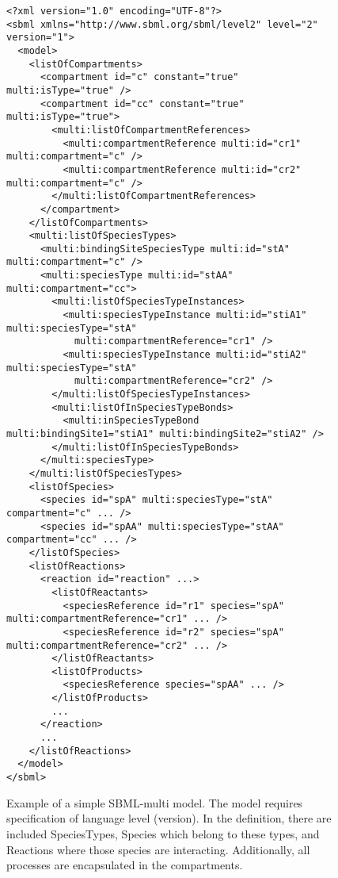 \documentclass[11pt,a4paper]{report}
\begin{document}
\begin{figure}[!h]
\lstset{language=XML}
\begin{lstlisting}[basicstyle=\scriptsize, frame=single]
<?xml version="1.0" encoding="UTF-8"?>
<sbml xmlns="http://www.sbml.org/sbml/level2" level="2" version="1">
  <model>
    <listOfCompartments>
      <compartment id="c" constant="true" multi:isType="true" />
      <compartment id="cc" constant="true" multi:isType="true">
        <multi:listOfCompartmentReferences>
          <multi:compartmentReference multi:id="cr1" multi:compartment="c" />
          <multi:compartmentReference multi:id="cr2" multi:compartment="c" />
        </multi:listOfCompartmentReferences>
      </compartment>
    </listOfCompartments>
    <multi:listOfSpeciesTypes>
      <multi:bindingSiteSpeciesType multi:id="stA" multi:compartment="c" />
      <multi:speciesType multi:id="stAA" multi:compartment="cc">
        <multi:listOfSpeciesTypeInstances>
          <multi:speciesTypeInstance multi:id="stiA1" multi:speciesType="stA"
            multi:compartmentReference="cr1" />
          <multi:speciesTypeInstance multi:id="stiA2" multi:speciesType="stA"
            multi:compartmentReference="cr2" />
        </multi:listOfSpeciesTypeInstances>
        <multi:listOfInSpeciesTypeBonds>
          <multi:inSpeciesTypeBond multi:bindingSite1="stiA1" multi:bindingSite2="stiA2" />
        </multi:listOfInSpeciesTypeBonds>
      </multi:speciesType>
    </multi:listOfSpeciesTypes>
    <listOfSpecies>
      <species id="spA" multi:speciesType="stA" compartment="c" ... />
      <species id="spAA" multi:speciesType="stAA" compartment="cc" ... />
    </listOfSpecies>
    <listOfReactions>
      <reaction id="reaction" ...>
        <listOfReactants>
          <speciesReference id="r1" species="spA" multi:compartmentReference="cr1" ... />
          <speciesReference id="r2" species="spA" multi:compartmentReference="cr2" ... />
        </listOfReactants>
        <listOfProducts>
          <speciesReference species="spAA" ... />
        </listOfProducts>
        ...
      </reaction>
      ...
    </listOfReactions>
  </model>
</sbml>
\end{lstlisting}
\caption{Example of a simple SBML-multi model. The model requires specification of language level (version). In the definition, there are included SpeciesTypes, Species which belong to these types, and Reactions where those species are interacting. Additionally, all processes are encapsulated in the compartments.}\label{SBML_example}
\end{figure}
\end{document}
